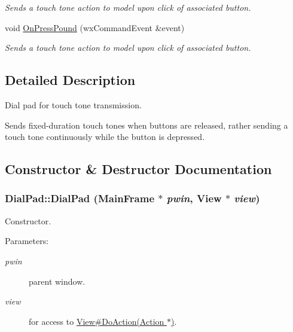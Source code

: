 \begin{CompactItemize}
\begin{CompactList}\small\item\em Sends a touch tone action to model upon click of associated button. \item\end{CompactList}\item 
void \hyperlink{classDialPad_19c18972706083103c18228c64a0acbb}{OnPressPound} (wxCommandEvent \&event)
\begin{CompactList}\small\item\em Sends a touch tone action to model upon click of associated button. \item\end{CompactList}\end{CompactItemize}


\subsection{Detailed Description}
Dial pad for touch tone transmission. 

Sends fixed-duration touch tones when buttons are released, rather sending a touch tone continuously while the button is depressed. 

\subsection{Constructor \& Destructor Documentation}
\hypertarget{classDialPad_4f25385be59567e595bad984693ec01f}{
\subsubsection[{DialPad}]{\setlength{\rightskip}{0pt plus 5cm}DialPad::DialPad ({\bf MainFrame} $\ast$ {\em pwin}, \/  {\bf View} $\ast$ {\em view})}}
\label{classDialPad_4f25385be59567e595bad984693ec01f}


Constructor. 

\begin{Desc}
\item[Parameters:]
\begin{description}
\item[{\em pwin}]parent window. \item[{\em view}]for access to \hyperlink{classView_cb2535000de204a5e4202c6ecce64666}{View\#DoAction(Action $\ast$)}. \end{description}
\end{Desc}


